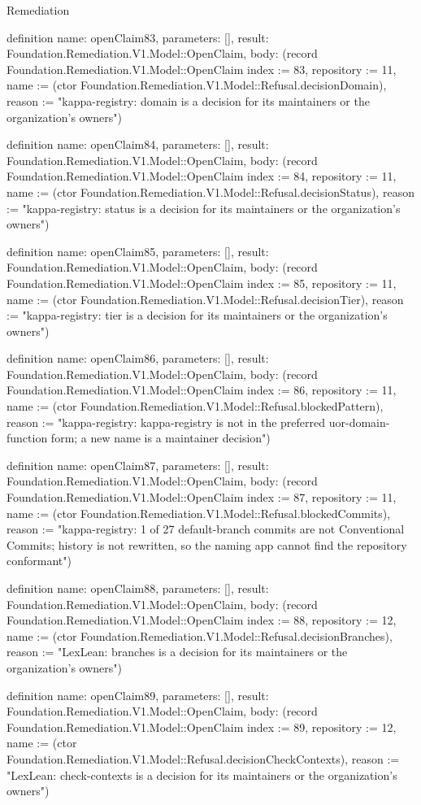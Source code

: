 \begin{lexlean}{Remediation}
\begin{semanticmodule}
definition{
  name: openClaim83,
  parameters: [],
  result: Foundation.Remediation.V1.Model::OpenClaim,
  body: (record Foundation.Remediation.V1.Model::OpenClaim {index := 83, repository := 11, name := (ctor Foundation.Remediation.V1.Model::Refusal.decisionDomain), reason := "kappa-registry: domain is a decision for its maintainers or the organization's owners"})
}

definition{
  name: openClaim84,
  parameters: [],
  result: Foundation.Remediation.V1.Model::OpenClaim,
  body: (record Foundation.Remediation.V1.Model::OpenClaim {index := 84, repository := 11, name := (ctor Foundation.Remediation.V1.Model::Refusal.decisionStatus), reason := "kappa-registry: status is a decision for its maintainers or the organization's owners"})
}

definition{
  name: openClaim85,
  parameters: [],
  result: Foundation.Remediation.V1.Model::OpenClaim,
  body: (record Foundation.Remediation.V1.Model::OpenClaim {index := 85, repository := 11, name := (ctor Foundation.Remediation.V1.Model::Refusal.decisionTier), reason := "kappa-registry: tier is a decision for its maintainers or the organization's owners"})
}

definition{
  name: openClaim86,
  parameters: [],
  result: Foundation.Remediation.V1.Model::OpenClaim,
  body: (record Foundation.Remediation.V1.Model::OpenClaim {index := 86, repository := 11, name := (ctor Foundation.Remediation.V1.Model::Refusal.blockedPattern), reason := "kappa-registry: kappa-registry is not in the preferred uor-{domain}-{function} form; a new name is a maintainer decision"})
}

definition{
  name: openClaim87,
  parameters: [],
  result: Foundation.Remediation.V1.Model::OpenClaim,
  body: (record Foundation.Remediation.V1.Model::OpenClaim {index := 87, repository := 11, name := (ctor Foundation.Remediation.V1.Model::Refusal.blockedCommits), reason := "kappa-registry: 1 of 27 default-branch commits are not Conventional Commits; history is not rewritten, so the naming app cannot find the repository conformant"})
}

definition{
  name: openClaim88,
  parameters: [],
  result: Foundation.Remediation.V1.Model::OpenClaim,
  body: (record Foundation.Remediation.V1.Model::OpenClaim {index := 88, repository := 12, name := (ctor Foundation.Remediation.V1.Model::Refusal.decisionBranches), reason := "LexLean: branches is a decision for its maintainers or the organization's owners"})
}

definition{
  name: openClaim89,
  parameters: [],
  result: Foundation.Remediation.V1.Model::OpenClaim,
  body: (record Foundation.Remediation.V1.Model::OpenClaim {index := 89, repository := 12, name := (ctor Foundation.Remediation.V1.Model::Refusal.decisionCheckContexts), reason := "LexLean: check-contexts is a decision for its maintainers or the organization's owners"})
}


\end{semanticmodule}
\end{lexlean}
